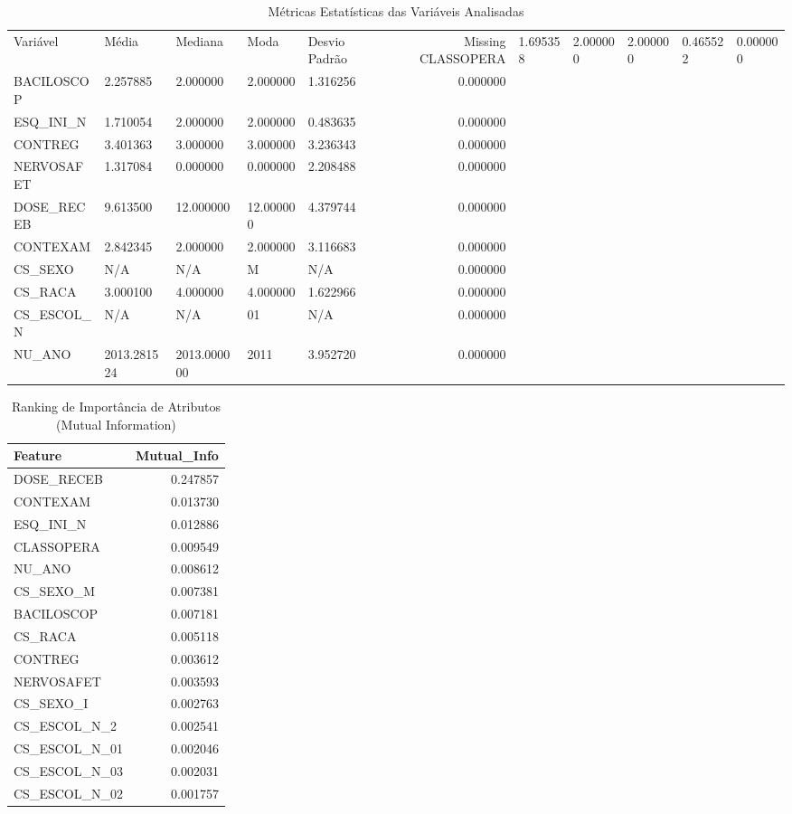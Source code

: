 \begin{table}
\caption{Métricas Estatísticas das Variáveis Analisadas}
\label{tab:metricas_vars}
\begin{tabular}{lllllr}
\toprule
Variável & Média & Mediana & Moda & Desvio Padrão & Missing %
\midrule
CLASSOPERA & 1.695358 & 2.000000 & 2.000000 & 0.465522 & 0.000000 \\
BACILOSCOP & 2.257885 & 2.000000 & 2.000000 & 1.316256 & 0.000000 \\
ESQ_INI_N & 1.710054 & 2.000000 & 2.000000 & 0.483635 & 0.000000 \\
CONTREG & 3.401363 & 3.000000 & 3.000000 & 3.236343 & 0.000000 \\
NERVOSAFET & 1.317084 & 0.000000 & 0.000000 & 2.208488 & 0.000000 \\
DOSE_RECEB & 9.613500 & 12.000000 & 12.000000 & 4.379744 & 0.000000 \\
CONTEXAM & 2.842345 & 2.000000 & 2.000000 & 3.116683 & 0.000000 \\
CS_SEXO & N/A & N/A & M & N/A & 0.000000 \\
CS_RACA & 3.000100 & 4.000000 & 4.000000 & 1.622966 & 0.000000 \\
CS_ESCOL_N & N/A & N/A & 01 & N/A & 0.000000 \\
NU_ANO & 2013.281524 & 2013.000000 & 2011 & 3.952720 & 0.000000 \\
\bottomrule
\end{tabular}
\end{table}


\begin{table}
\caption{Ranking de Importância de Atributos (Mutual Information)}
\label{tab:importancia_mi}
\begin{tabular}{lr}
\toprule
Feature & Mutual_Info \\
\midrule
DOSE_RECEB & 0.247857 \\
CONTEXAM & 0.013730 \\
ESQ_INI_N & 0.012886 \\
CLASSOPERA & 0.009549 \\
NU_ANO & 0.008612 \\
CS_SEXO_M & 0.007381 \\
BACILOSCOP & 0.007181 \\
CS_RACA & 0.005118 \\
CONTREG & 0.003612 \\
NERVOSAFET & 0.003593 \\
CS_SEXO_I & 0.002763 \\
CS_ESCOL_N_2 & 0.002541 \\
CS_ESCOL_N_01 & 0.002046 \\
CS_ESCOL_N_03 & 0.002031 \\
CS_ESCOL_N_02 & 0.001757 \\
\bottomrule
\end{tabular}
\end{table}
